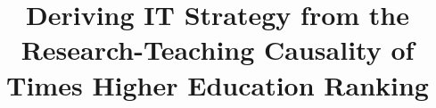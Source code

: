 \documentclass[conference]{IEEEtran}
\begin{document}
%

\title{Deriving IT Strategy from the Research-Teaching Causality of Times Higher Education Ranking}
\end{document}
